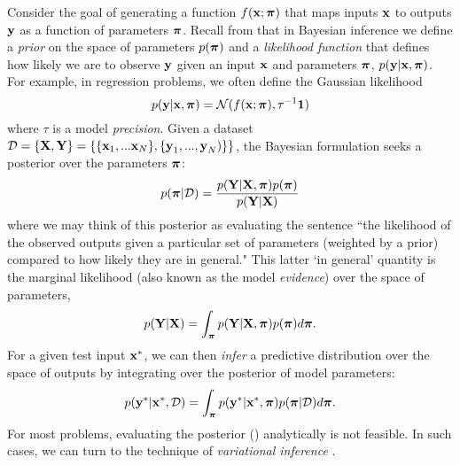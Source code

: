 Consider the goal of generating a function $f(\boldsymbol{\mathbf{x}}; \boldsymbol{\mathbf{\pi}})$ that maps inputs $\boldsymbol{\mathbf{x}}$ to outputs $\boldsymbol{\mathbf{y}}$ as a function of parameters $\boldsymbol{\mathbf{\pi}}$. Recall from  that in Bayesian inference we define a \textit{prior} on the space of parameters $p(\boldsymbol{\mathbf{\pi}})$ and a \textit{likelihood function} that defines how likely we are to observe $\boldsymbol{\mathbf{y}}$ given an input $\boldsymbol{\mathbf{x}}$ and parameters $\boldsymbol{\mathbf{\pi}}$, $p(\boldsymbol{\mathbf{y}} | \boldsymbol{\mathbf{x}}, \boldsymbol{\mathbf{\pi}})$. For example, in regression problems, we often define the Gaussian likelihood
\begin{equation}
	p(\boldsymbol{\mathbf{y}} | \boldsymbol{\mathbf{x}}, \boldsymbol{\mathbf{\pi}}) = \mathcal{N}(f(\boldsymbol{\mathbf{x}}; \boldsymbol{\mathbf{\pi}}),\tau^{-1}\boldsymbol{\mathbf{1}})
\end{equation}
where $\tau$ is a model \textit{precision}. Given a dataset $\mathcal{D} = \{\boldsymbol{\mathbf{X}}, \boldsymbol{\mathbf{Y}}\} = \{\{\boldsymbol{\mathbf{x}}_1, ... \boldsymbol{\mathbf{x}}_N\},\{\boldsymbol{\mathbf{y}}_1, ..., \boldsymbol{\mathbf{y}}_N)\} \}$, the Bayesian formulation seeks a posterior over the parameters $\boldsymbol{\mathbf{\pi}}$:
\begin{equation}
\label{eq:sun_bcnn_param_posterior}
	p(\boldsymbol{\mathbf{\pi}} | \mathcal{D}) = \frac{p(\boldsymbol{\mathbf{Y}}|\boldsymbol{\mathbf{X}}, \boldsymbol{\mathbf{\pi}}) p(\boldsymbol{\mathbf{\pi}})}{p(\boldsymbol{\mathbf{Y}} | \boldsymbol{\mathbf{X}})}
\end{equation}
where we may think of this posterior as evaluating the sentence ``the likelihood of the observed outputs given a particular set of parameters (weighted by a prior) compared to how likely they are in general." This latter `in general' quantity is the marginal likelihood (also known as the model \textit{evidence}) over the space of parameters,
\begin{equation}
	p(\boldsymbol{\mathbf{Y}} | \boldsymbol{\mathbf{X}}) = \int_{\boldsymbol{\mathbf{\pi}}}  p(\boldsymbol{\mathbf{Y}} | \boldsymbol{\mathbf{X}}, \boldsymbol{\mathbf{\pi}}) p(\boldsymbol{\mathbf{\pi}}) d\boldsymbol{\mathbf{\pi}}.
\end{equation}
For a given test input $\boldsymbol{\mathbf{x}}^*$, we can then \textit{infer} a predictive distribution over the space of outputs by integrating over the posterior of model parameters:
\begin{equation}
	p(\boldsymbol{\mathbf{y}}^* | \boldsymbol{\mathbf{x}}^*, \mathcal{D}) = \int_{\boldsymbol{\mathbf{\pi}}}  p(\boldsymbol{\mathbf{y}}^* | \boldsymbol{\mathbf{x}}^*, \boldsymbol{\mathbf{\pi}}) p(\boldsymbol{\mathbf{\pi}} | \mathcal{D}) d\boldsymbol{\mathbf{\pi}}.
\end{equation}
For most problems, evaluating the posterior () analytically is not feasible. In such cases, we can turn to the technique of \textit{variational inference} \citep{Gal2016UncertaintyThesis}.

